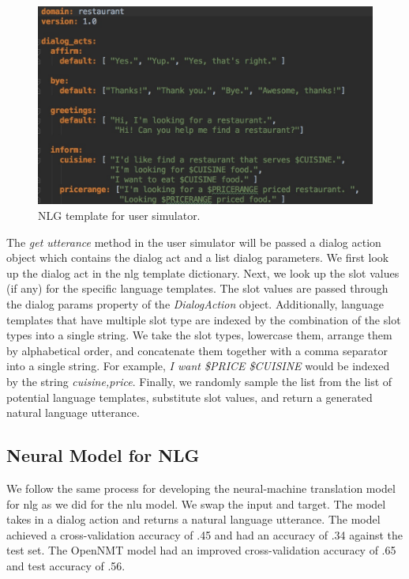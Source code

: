 \begin{figure}[h!]
	\centering
	\includegraphics[scale=.35]{diagrams/nlg_template_restaurant.jpeg}
	\caption{ NLG template for user simulator. }
	\label{fig:res_nlg}
\end{figure}

The \textit{get utterance} method in the user simulator will be passed a dialog action object which contains the dialog act and a list dialog parameters. We first look up the dialog act in the nlg template dictionary. Next, we look up the slot values (if any) for the specific language templates. The slot values are passed through the dialog params property of the \textit{DialogAction} object. Additionally, language templates that have multiple slot type are indexed by the combination of the slot types into a single string. We take the slot types, lowercase them, arrange them by alphabetical order, and concatenate them together with a comma separator into a single string. For example, \textit{I want \$PRICE \$CUISINE} would be indexed by the string \textit{cuisine,price}. Finally, we randomly sample the list from the list of potential language templates, substitute slot values, and return a generated natural language utterance. 


\subsection{Neural Model for NLG}

We follow the same process for developing the neural-machine translation model for nlg as we did for the nlu model. We swap the input and target. The model takes in a dialog action and returns a natural language utterance. The \cite{brownlee_2017} model achieved a cross-validation accuracy of .45 and had an accuracy of .34 against the test set. The OpenNMT model had an improved cross-validation accuracy of .65 and test accuracy of .56.  

